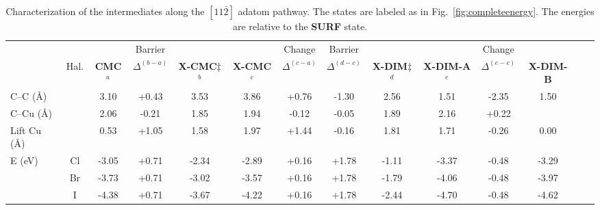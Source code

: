 \documentclass[%
 reprint,
 amsmath,amssymb,
 aps,
prb,
floatfix,
]{revtex4-2}
\begin{document}
\begin{table}
\centering\caption{Characterization of the intermediates along the $[11\bar{2}]$ adatom pathway. The states are labeled as in Fig.~\ref{fig:completeenergy}. The energies are relative to the \textbf{SURF} state.}
\label{table:adatom-longitude}
\begin{tabular}{ lccccccccccccc  }
 \hline
 \hline
  & & & Barrier & & & Change & Barrier& & &Change&\\
  & Hal. & \textbf{CMC}$^{a}$ & $\Delta^{(b-a)}$ & \textbf{X-CMC$\ddagger$}$^{b}$ & \textbf{X-CMC}$^{c}$ &$\Delta^{(c-a)}$ & $\Delta^{(d-c)}$ & \textbf{X-DIM$\ddagger$}$^{d}$ & \textbf{X-DIM-A}$^{e}$ &$\Delta^{(e-c)}$ & \textbf{X-DIM-B}  \\ 
 \hline 
 {C--C (\si{\angstrom})} & & {3.10} & {+0.43} & {3.53} & {3.86} &{+0.76} & {-1.30} & {2.56} & {1.51} &{-2.35} &{1.50}\\ 
 \hline
 {C--Cu (\si{\angstrom}) } & & {2.06} & {-0.21} & {1.85} & {1.94} &{-0.12} & {-0.05} & {1.89} & {2.16} &{+0.22} &{} \\ 
 \hline
 {Lift Cu (\si{\angstrom}) } & & {0.53} & {+1.05} & {1.58} & {1.97} &{+1.44} & {-0.16} & {1.81} & {1.71} &{-0.26} &{0.00}\\ 
 \hline
 \multirow{3}{*}{E (\si{\electronvolt}) } & Cl & -3.05 & +0.71 &-2.34 &-2.89 &+0.16 & +1.78 &-1.11 & -3.37&-0.48&-3.29\\ 
 & Br &-3.73 &+0.71 &-3.02 & -3.57 &+0.16 & +1.78 &-1.79 & -4.06 & -0.48&-3.97 \\ 
 & I  & -4.38 & +0.71 & -3.67& -4.22 &+0.16& +1.78 &-2.44 & -4.70 & -0.48&-4.62\\ 
 \hline
 \hline
\end{tabular}
\end{table}


\end{document}

